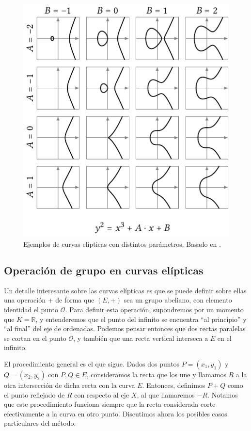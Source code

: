 \documentclass[
  a4paper,
  12pt,
  spanish,
]{scrartcl}
\begin{document}
\begin{figure}[h]
  \centering
  \includegraphics[width=.75\textwidth]{img/parametros-curvas}
  \caption{Ejemplos de curvas elípticas con distintos parámetros. Basado en  \parencite{eichlseder_elliptic_2016}.}
  \label{fig:parametros}
\end{figure}

\subsection{Operación de grupo en curvas elípticas}

Un detalle interesante sobre las curvas elípticas es que se puede definir sobre ellas una operación $+$ de forma que $(E, +)$ sea un grupo abeliano, con elemento identidad el punto $\mathcal{O}$. Para definir esta operación, supondremos por un momento que $K = \mathbb{R}$, y entenderemos que el punto del infinito se encuentra ``al principio'' y ``al final'' del eje de ordenadas. Podemos pensar entonces que dos rectas paralelas se cortan en el punto $\mathcal{O}$, y también que una recta vertical interseca a $E$ en el infinito.

    El procedimiento general es el que sigue. Dados dos puntos $P = (x_1, y_1)$ y $Q = (x_2, y_2)$ con $P,Q \in E$, consideramos la recta que los une y llamamos $R$ a la otra intersección de dicha recta con la curva $E$. Entonces, definimos $P + Q$ como el punto reflejado de $R$ con respecto al eje $X$, al que llamaremos $-R$. Notamos que este procedimiento funciona siempre que la recta considerada corte efectivamente a la curva en otro punto. Discutimos ahora los posibles casos particulares del método.
    
\end{document}
